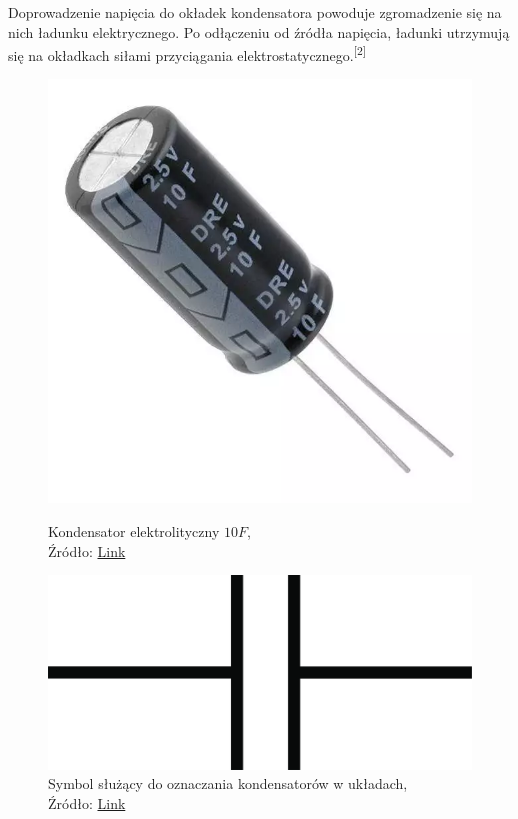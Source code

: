 \documentclass{article}
\begin{document}
        Doprowadzenie napięcia do okładek kondensatora powoduje zgromadzenie się na nich ładunku elektrycznego. Po odłączeniu od źródła napięcia, ładunki utrzymują się na okładkach siłami przyciągania elektrostatycznego.\textsuperscript{[2]}

        \begin{figure}[!ht]
            \begin{minipage}{.5\textwidth}
                \centering
                \includegraphics[scale=0.175]{grafiki/Kondensator_elektrolityczny_10F.png}
                \caption{Kondensator elektrolityczny $10F$,
                \\Źródło: \href{https://sklep.avt.pl/pol_pl_Kondensator-elektrolityczny-10F-2-5V-Samxon-DRE-172370_1.webp}{Link}}
            \end{minipage}
            \begin{minipage}{.5\textwidth}
                \centering
                \includegraphics[scale=0.075]{grafiki/Kondensator_symbol.jpg}
                \caption{Symbol służący do oznaczania kondensatorów w układach,
                \\Źródło: \href{https://elportal.pl/i/2022/05/06/9931-d309-1600x0_007-05.jpg}{Link}}
            \end{minipage}
        \end{figure}
        
\end{document}
